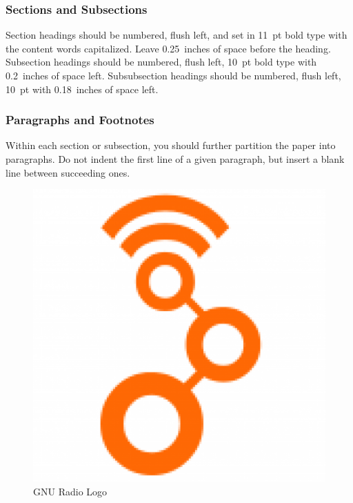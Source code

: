 \documentclass{article}
\begin{document}
\subsubsection{Sections and Subsections}

Section headings should be numbered, flush left, and set in 11~pt bold
type with the content words capitalized. Leave 0.25~inches of space
before the heading.  Subsection headings should be numbered, flush left, 
10~pt bold type with 0.2~inches of space left.  Subsubsection headings 
should be numbered, flush left, 10~pt with 0.18~inches of space left.

\subsubsection{Paragraphs and Footnotes}

Within each section or subsection, you should further partition the
paper into paragraphs. Do not indent the first line of a given
paragraph, but insert a blank line between succeeding ones.

\begin{figure}[ht]
  \begin{center}
    \centerline{\includegraphics[width=\columnwidth]{gr.png}}
    \caption{GNU Radio Logo}
    \label{grlogo}
  \end{center}
\end{figure} 
\end{document}
